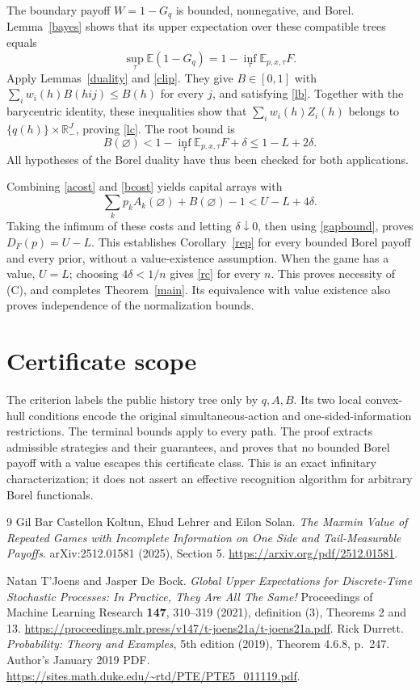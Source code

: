 \documentclass[11pt,a4paper]{article}
\theoremstyle{definition}
\newcommand{\R}{\mathbb R}
\newcommand{\E}{\mathbb E}
\begin{document}
The boundary payoff $W=1-G_q$ is bounded, nonnegative, and Borel.
Lemma~\ref{bayes} shows that its upper expectation over these compatible
trees equals
\[
 \sup_\tau\E(1-G_q)=1-\inf_\tau\E_{p,x,\tau}F.
\]
Apply Lemmas~\ref{duality} and \ref{clip}. They give $B\in[0,1]$ with
$\sum_i w_i(h)B(hij)\leq B(h)$ for every $j$, and satisfying
\eqref{lb}. Together with the barycentric identity, these inequalities
show that $\sum_i w_i(h)Z_i(h)$ belongs to
$\{q(h)\}\times\R_-^J$, proving \eqref{lc}. The root bound is
\begin{equation}
 B(\varnothing)<1-\inf_\tau\E_{p,x,\tau}F+\delta
 \leq1-L+2\delta.
 \label{bcost}
\end{equation}
All hypotheses of the Borel duality have thus been checked for both
applications.

Combining \eqref{acost} and \eqref{bcost} yields capital arrays with
\[
 \sum_k p_k A_k(\varnothing)+B(\varnothing)-1
 <U-L+4\delta.
\]
Taking the infimum of these costs and letting $\delta\downarrow0$, then
using \eqref{gapbound}, proves
$D_F(p)=U-L$. This establishes Corollary~\ref{rep} for every bounded
Borel payoff and every prior, without a value-existence assumption.
When the game has a value, $U=L$; choosing $4\delta<1/n$ gives
\eqref{rc} for every $n$. This proves necessity of (C), and completes
Theorem~\ref{main}. Its equivalence with value existence also proves
independence of the normalization bounds.

\section{Certificate scope}
The criterion labels the public history tree only by $q,A,B$. Its two
local convex-hull conditions encode the original simultaneous-action
and one-sided-information restrictions. The terminal bounds apply to
every path. The proof extracts admissible strategies and their guarantees,
and proves that no bounded Borel payoff with a value escapes this
certificate class. This is an exact infinitary characterization; it does
not assert an effective recognition algorithm for arbitrary Borel
functionals.

\begin{thebibliography}{9}
Gil Bar Castellon Koltun, Ehud Lehrer and Eilon Solan.
\emph{The Maxmin Value of Repeated Games with Incomplete Information on
One Side and Tail-Measurable Payoffs}.
arXiv:2512.01581 (2025), Section 5.
\url{https://arxiv.org/pdf/2512.01581}.

Natan T'Joens and Jasper De Bock.
\emph{Global Upper Expectations for Discrete-Time Stochastic Processes:
In Practice, They Are All The Same!}
Proceedings of Machine Learning Research \textbf{147}, 310--319 (2021),
definition (3), Theorems 2 and 13.
\url{https://proceedings.mlr.press/v147/t-joens21a/t-joens21a.pdf}.
Rick Durrett. \emph{Probability: Theory and Examples}, 5th edition
(2019), Theorem 4.6.8, p.~247. Author's January 2019 PDF.
\url{https://sites.math.duke.edu/~rtd/PTE/PTE5_011119.pdf}.
\end{thebibliography}
\end{document}

